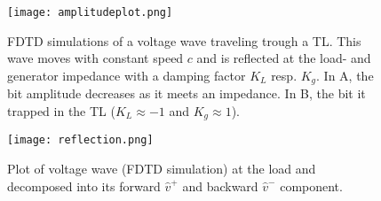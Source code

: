 \begin{figure}[h!]
\centering
\texttt{[image: amplitudeplot.png]}
\caption{FDTD simulations of a voltage wave traveling trough a TL. This wave moves with constant speed $c$ and is reflected at the load- and generator impedance with a damping factor $K_L$ resp. $K_g$. In A, the bit amplitude decreases as it meets an impedance. In B, the bit it trapped in the TL ($K_L\approx-1$ and $K_g \approx1$).}\label{fig:damp}
\end{figure}

\begin{figure}[h!]
\centering
\texttt{[image: reflection.png]}
\caption{Plot of voltage wave (FDTD simulation) at the load and decomposed into its forward $\hat{v}^{+}$ and backward $\hat{v}^{-}$ component.}\label{fig:refl}
\end{figure}